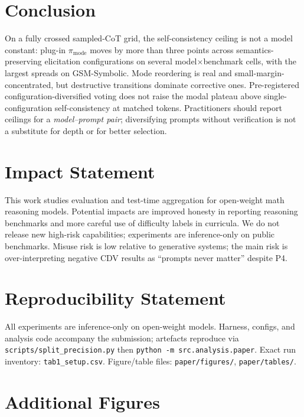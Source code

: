 \documentclass{article}
\newcommand{\pmode}{\pi_{\mathrm{mode}}}
\begin{document}
\section{Conclusion}
\label{sec:conclusion}

On a fully crossed sampled-CoT grid, the self-consistency ceiling is not a model
constant: plug-in $\pmode$ moves by more than three points across
semantics-preserving elicitation configurations on several
model$\times$benchmark cells, with the largest spreads on GSM-Symbolic.
Mode reordering is real and small-margin-concentrated, but destructive
transitions dominate corrective ones. Pre-registered configuration-diversified
voting does not raise the modal plateau above single-configuration
self-consistency at matched tokens. Practitioners should report ceilings for a
\emph{model--prompt pair}; diversifying prompts without verification is not a
substitute for depth or for better selection.

\section*{Impact Statement}
This work studies evaluation and test-time aggregation for open-weight math
reasoning models. Potential impacts are improved honesty in reporting reasoning
benchmarks and more careful use of difficulty labels in curricula. We do not
release new high-risk capabilities; experiments are inference-only on public
benchmarks. Misuse risk is low relative to generative systems; the main risk is
over-interpreting negative CDV results as ``prompts never matter'' despite P4.

\section*{Reproducibility Statement}
All experiments are inference-only on open-weight models. Harness, configs, and
analysis code accompany the submission; artefacts reproduce via
\texttt{scripts/split\_precision.py} then
\texttt{python -m src.analysis.paper}. Exact run inventory: \texttt{tab1\_setup.csv}.
Figure/table files: \texttt{paper/figures/}, \texttt{paper/tables/}.




\clearpage
\appendix
\section{Additional Figures}
\label{app:extra-figs}
\end{document}
